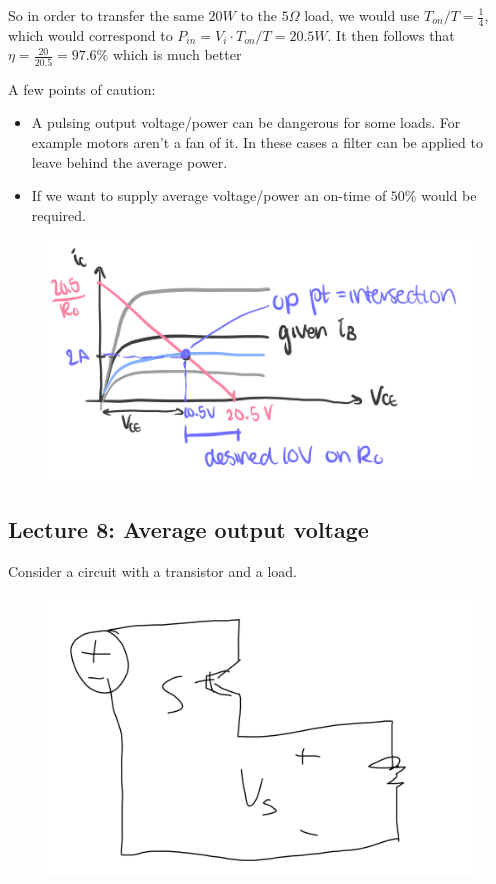 \documentclass[../notes.tex]{subfiles}
\begin{document}
So in order to transfer the same $ 20W $  to the $ 5 \Omega $ load, we would use $ T_{on}/T = \frac{1}{4} $, which would correspond to $ P_{in} = V_{i} \cdot T_{on}/T = 20.5W  $. 
It then follows that $ \eta = \frac{20}{20.5} = 97.6\% $ which is much better

A few points of caution:

\begin{itemize}
	\item A pulsing output voltage/power can be dangerous for some loads. For example motors aren't a fan of it. In these cases a filter can be applied to leave behind the average power.
	\item If we want to supply average voltage/power an on-time of $ 50\% $ would be required. 
\end{itemize}









\begin{figure}[H]
	\centering
	\includegraphics[width=0.8\linewidth]{img/image_2022-09-23-02-48-01.png}
\end{figure}




\subsection{Lecture 8: Average output voltage}


Consider a circuit with a transistor and a load.

\begin{figure}[H]
	\centering
	\includegraphics[width=0.8\linewidth]{img/image_2022-09-23-15-21-54.png}
\end{figure}
\end{document}
